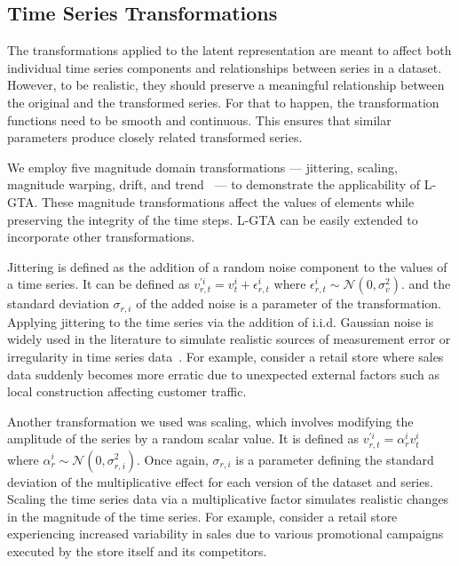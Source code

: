 \subsection{Time Series Transformations}
\label{chap:tranfs}



The transformations applied to the latent representation are meant to affect both individual time series components and relationships between series in a dataset. However, to be realistic, they should preserve a meaningful relationship between the original and the transformed series. For that to happen, the transformation functions need to be smooth and continuous. This ensures that similar parameters produce closely related transformed series.


We employ five magnitude domain transformations — jittering, scaling, magnitude warping, drift, and trend~\cite{Iwana_2021} — to demonstrate the applicability of L-GTA. These magnitude transformations affect the values of elements while preserving the integrity of the time steps. L-GTA can be easily extended to incorporate other transformations.

Jittering is defined as the addition of a random noise component to the values of a time series. It can be defined as $v_{r,t}^{'i} = v_{t}^i + \epsilon^i_{r,t}$ where $\epsilon^i_{r,t} \sim \mathcal{N}(0, \sigma_v^2)$.
%
and the standard deviation $\sigma_{r, i}$ of the added noise is a parameter of the transformation. Applying jittering to the time series via the addition of i.i.d. Gaussian noise is widely used in the literature to simulate realistic sources of measurement error or irregularity in time series data~\cite{Iwana_2021}. For example, consider a retail store where sales data suddenly becomes more erratic due to unexpected external factors such as local construction affecting customer traffic.


Another transformation we used was scaling, which involves modifying the amplitude of the series by a random scalar value. It is defined as ${v}_{r,t}^{'i} = \alpha^i_{r} {v}_{t}^i$ where $\alpha^i_{r} \sim \mathcal{N}(0, \sigma_{r,i}^2)$. Once again, $\sigma_{r, i}$ is a parameter defining the standard deviation of the multiplicative effect for each version of the dataset and series. Scaling the time series data via a multiplicative factor simulates realistic changes in the magnitude of the time series. For example, consider a retail store experiencing increased variability in sales due to various promotional campaigns executed by the store itself and its competitors.


